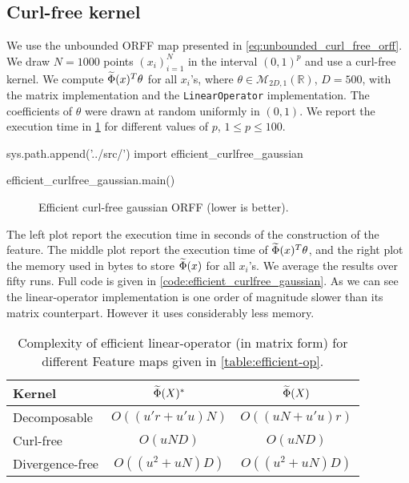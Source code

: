 \subsection{Curl-free kernel}
We use the unbounded \acs{ORFF} map presented in \cref{eq:unbounded_curl_free_orff}. We draw $N=1000$ points $(x_i)_{i=1}^N$ in the interval $(0,1)^{p}$ and use a curl-free kernel. We compute $\widetilde{\Phi}(x)^T\theta$ for all $x_i$'s, where $\theta\in\mathcal{M}_{2D,1}(\mathbb{R})$, $D=500$, with the matrix implementation and the \texttt{LinearOperator} implementation. The coefficients of $\theta$ were drawn at random uniformly in $(0,1)$. We report the execution time in \cref{fig:efficient_curlfree_gaussian} for different values of $p$, $1\le p\le100$.
\begin{pycode}
sys.path.append('../src/')
import efficient_curlfree_gaussian

efficient_curlfree_gaussian.main()
\end{pycode}
\begin{figure}[htb]
\caption[Efficient curl-free gaussian \acs{ORFF}]{Efficient curl-free gaussian ORFF (lower is better).}
\label{fig:efficient_curlfree_gaussian}
\end{figure}
The left plot report the execution time in seconds of the construction of the feature. The middle plot report the execution time of $\widetilde{\Phi}(x)^T\theta$, and the right plot the memory used in bytes  to store $\widetilde{\Phi}(x)$ for all $x_i$'s. We average the results over fifty runs. Full code is given in \cref{code:efficient_curlfree_gaussian}. As we can see the linear-operator implementation is one order of magnitude slower than its matrix counterpart. However it uses considerably less memory.
\begin{table}[htb]
\centering
\caption[Complexity of efficient linear-operators for different \acs{ORFF}.]{Complexity of efficient linear-operator (in matrix form) for different Feature maps given in \cref{table:efficient-op}. \label{table:efficient-complexity}}
\begin{tabularx}{\textwidth}{Xcc}
\toprule
    Kernel & $\widetilde{\Phi}(X)^*$ & $\widetilde{\Phi}(X)$ \\
\midrule
    Decomposable & $O\left((u'r+u'u)N\right)$ & $O\left((uN+u'u)r\right)$ \\
    Curl-free & $O\left(uND\right)$ & $O\left(uND\right)$ \\
    Divergence-free & $O\left((u^2+uN)D\right)$ & $O\left((u^2+uN)D\right)$ \\
\bottomrule
\end{tabularx}
\end{table}

